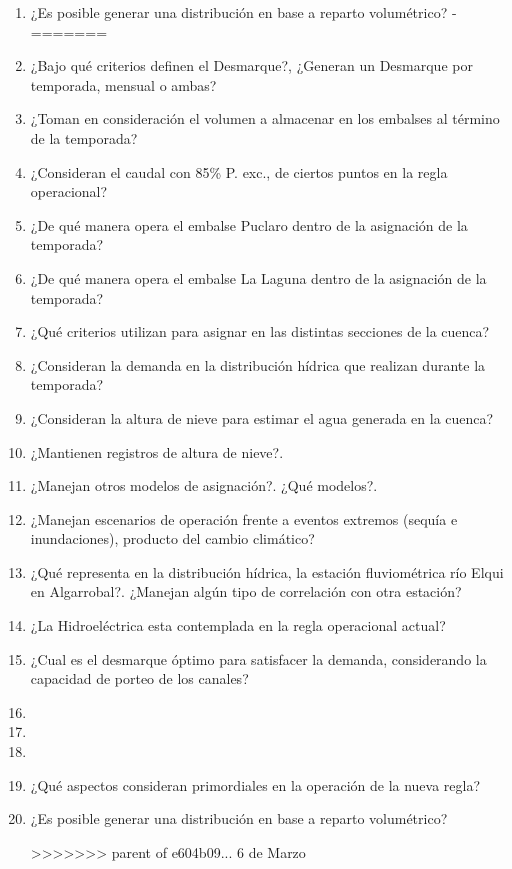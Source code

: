 \documentclass[10pt,]{article}
\begin{document}
\begin{enumerate}
 -\item ¿Es posible generar una distribución en base a reparto volumétrico?		
 -\bigskip
=======
\item ¿Bajo qué criterios definen el Desmarque?, ¿Generan un Desmarque por temporada, mensual o ambas?
\item ¿Toman en consideración el volumen a almacenar en los embalses al término de la temporada?
\item ¿Consideran el caudal con 85\% P. exc., de ciertos puntos en la regla operacional?
\item ¿De qué manera opera el embalse Puclaro dentro de la asignación de la temporada?
\item ¿De qué manera opera el embalse La Laguna dentro de la asignación de la temporada?
\item ¿Qué criterios utilizan para asignar en las distintas secciones de la cuenca?
\item ¿Consideran la demanda en la distribución hídrica que realizan durante la temporada?
\item ¿Consideran la altura de nieve para estimar el agua generada en la cuenca? 
\item ¿Mantienen registros de altura de nieve?.
\item ¿Manejan otros modelos de asignación?. ¿Qué modelos?.
\item ¿Manejan escenarios de operación frente a eventos extremos (sequía e inundaciones), producto del cambio climático?
\item ¿Qué representa en la distribución hídrica, la estación fluviométrica río Elqui en Algarrobal?. ¿Manejan algún tipo de correlación con otra estación?
\item ¿La Hidroeléctrica esta contemplada en la regla operacional actual?
\item ¿Cual es el desmarque óptimo para satisfacer la demanda, considerando la capacidad de porteo de los canales?
\item 
\item 
\item 
\item ¿Qué aspectos consideran primordiales en la operación de la nueva regla?
\item ¿Es posible generar una distribución en base a reparto volumétrico?
\bigskip

>>>>>>> parent of e604b09... 6 de Marzo
\end{enumerate}

\newpage
\end{document}
